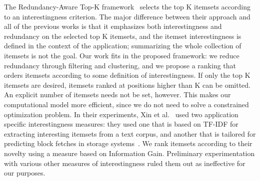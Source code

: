 \documentclass[letterpaper,12pt,titlepage,oneside,final]{book}
\begin{document}
The Redundancy-Aware Top-K framework~\cite{xin2006extracting} selects the top K itemsets according to an 
interestingness criterion. %
The major difference between their approach and all of the previous works is that 
it emphasizes both interestingness and redundancy on the selected top K itemsets, 
and the itemset interestingness is defined in the context of the application; 
summarizing the whole collection of itemsets is not the goal.
Our work fits in the proposed framework: 
we reduce redundancy through filtering and clustering, 
and we propose a ranking that orders itemsets according to some definition of interestingness.
If only the top K itemsets are desired, itemsets ranked at positions higher than K can be omitted.
An explicit number of itemsets needs not be set, however.
This makes our computational model more efficient, 
since we do not need to solve a constrained optimization problem.
In their experiments, Xin et al.~\cite{xin2006extracting} used two application specific interestingness measures:
they used one that is based on TF-IDF for extracting interesting itemsets from a text corpus, 
and another that is tailored for predicting block fetches in storage systems~\cite{li2004c}.
We rank itemsets according to their novelty using a measure based on Information Gain. 
Preliminary experimentation with various other measures of interestingness 
ruled them out as ineffective 
for our purposes.

\end{document}
